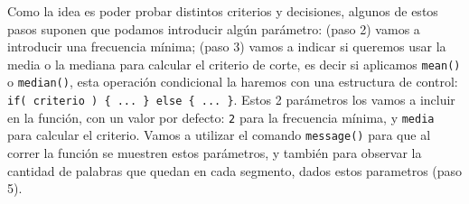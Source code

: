 \documentclass[
]{book}
\begin{document}
Como la idea es poder probar distintos criterios y decisiones, algunos de estos pasos suponen que podamos introducir algún parámetro:
(paso 2) vamos a introducir una frecuencia mínima;
(paso 3) vamos a indicar si queremos usar la media o la mediana para calcular el criterio de corte, es decir si aplicamos \texttt{mean()} o \texttt{median()}, esta operación condicional la haremos con una estructura de control: \texttt{if(\ criterio\ )\ \{\ ...\ \}\ else\ \{\ ...\ \}}.
Estos 2 parámetros los vamos a incluir en la función, con un valor por defecto: \texttt{2} para la frecuencia mínima, y \texttt{media} para calcular el criterio.
Vamos a utilizar el comando \texttt{message()} para que al correr la función se muestren estos parámetros, y también para observar la cantidad de palabras que quedan en cada segmento, dados estos parametros (paso 5).
\end{document}
